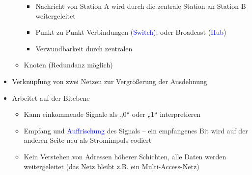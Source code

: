 \begin{itemize}
\begin{itemize}
        \begin{itemize}
            \item Nachricht von Station A wird durch die zentrale Station an Station B weitergeleitet
            \item Punkt-zu-Punkt-Verbindungen (\textcolor{blue}{Switch}), oder Broadcast (\textcolor{blue}{Hub})
            \item Verwundbarkeit durch zentralen
        \end{itemize}
        \item Knoten (Redundanz möglich)
    \end{itemize}
\end{itemize}

\begin{itemize}
    \item Verknüpfung von zwei Netzen zur Vergrößerung der Ausdehnung
    \item Arbeitet auf der Bitebene
    \begin{itemize}
        \item Kann einkommende Signale als „0“ oder „1“ interpretieren
        \item Empfang und \textcolor{blue}{Auffrischung} des Signals – ein empfangenes Bit wird auf der anderen Seite neu als Stromimpuls codiert
        \item Kein Verstehen von Adressen höherer Schichten, alle Daten werden weitergeleitet (das Netz bleibt z.B. ein Multi-Access-Netz)
    \end{itemize}
\end{itemize}

